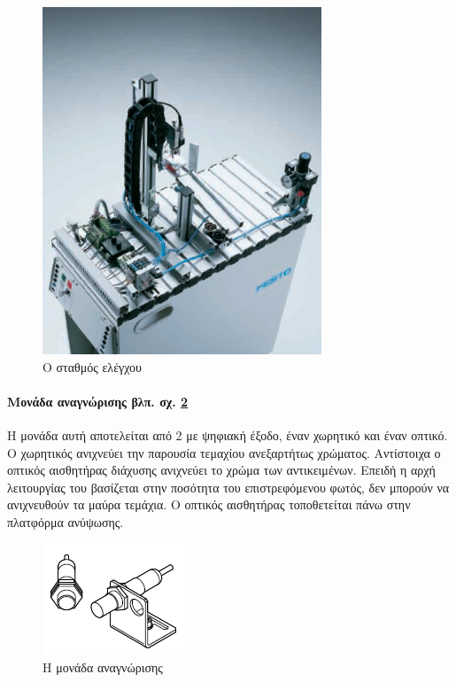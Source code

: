 \documentclass[a4paper,12pt,twoside]{report}
\begin{document}
{				\begin{figure}[hp]
					\centering
					\includegraphics[scale=0.25]{TestingStationFesto.png}
					\caption{Ο σταθμός ελέγχου \cite{OverviewMPSStations}}
					\label{φωτ:Ο σταθμός ελέγχου από Festo}
				\end{figure}
								
				\paragraph{Μονάδα αναγνώρισης {\footnotesize βλπ. σχ. \ref{φωτ:Η μονάδα αναγνώρισης από Festo}}} {Η μονάδα αυτή αποτελείται από 2  με ψηφιακή έξοδο, έναν χωρητικό και έναν οπτικό. Ο χωρητικός ανιχνεύει την παρουσία τεμαχίου ανεξαρτήτως χρώματος. Αντίστοιχα ο οπτικός αισθητήρας διάχυσης ανιχνεύει το χρώμα των αντικειμένων. Επειδή η αρχή λειτουργίας του βασίζεται στην ποσότητα του επιστρεφόμενου φωτός, δεν μπορούν να ανιχνευθούν τα μαύρα τεμάχια. Ο οπτικός αισθητήρας τοποθετείται πάνω στην πλατφόρμα ανύψωσης.
				}
				\begin{figure}[hp]
					\centering
					\includegraphics[scale=1]{TestingStationRecognitionModule.png}
					\caption{Η μονάδα αναγνώρισης \cite{FestoMPSTestingStationManual}}
					\label{φωτ:Η μονάδα αναγνώρισης από Festo}
				\end{figure}
				
}
\end{document}
